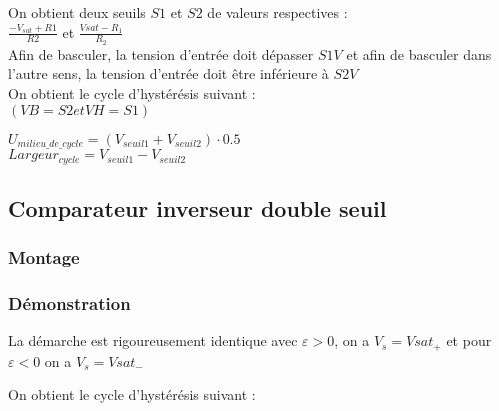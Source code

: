 On obtient deux seuils $S1$ et $S2$ de valeurs respectives : \\


$\frac{-V_{sat}+R1}{R2}$ et $\frac{Vsat - R_1}{R_2}$ \\



Afin de basculer, la tension d’entrée doit dépasser $S1 V$ et afin de basculer dans l’autre sens, la tension d’entrée doit 
être inférieure à $S2 V$ \\


On obtient le cycle d’hystérésis suivant : \\

$(VB=S2 et VH=S1)$




$U_{milieu\_de\_cycle}=(V_{seuil1}+V_{seuil2}) \cdot 0.5$ \\
$Largeur_{cycle}=V_{seuil1}-V_{seuil2}$



\subsection{Comparateur inverseur double seuil}

\subsubsection{Montage}


\subsubsection{Démonstration}

La démarche est rigoureusement identique avec $\varepsilon>0$, on a $V_s=Vsat_+$
et pour  $\varepsilon<0$ on a $V_s=Vsat_-$

On obtient le cycle d’hystérésis suivant : \\


